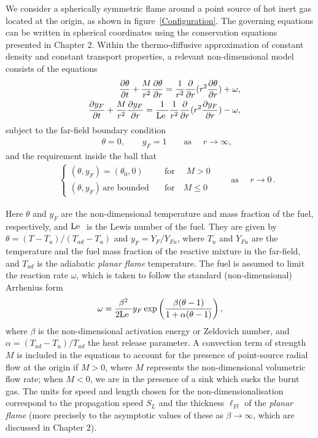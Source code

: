 We consider a spherically symmetric flame around a point source of
hot inert gas located at the origin, as shown in figure~\ref{Configuration}. The governing equations can be written in spherical coordinates using the conservation equations presented in Chapter 2. Within the thermo-diffusive
approximation of constant density and constant transport properties,
a relevant non-dimensional model consists of the equations
\begin{eqnarray}
&&\label{eqn:num:theta}\frac{\partial{\theta}}{{\partial t}}+
\frac{M}{r^2}\frac{\partial{\theta}}{{\partial r}}=\frac{1}
{r^{2}}\frac{\partial}{\partial r} (r^{2}\frac{
\partial{\theta}}{{\partial r}})+ \omega,
\\
&&\label{eqn:num:yF}\frac{\partial{y_{F}}}{{\partial t}}+
\frac{M}{r^2}\frac{\partial{y_{F}}}{{\partial
r}}=\frac{1}{\text{Le }}\frac{1} {r^{2}}\frac{\partial}{\partial r}
(r^{2}\frac{
\partial{y_{F}}}{{\partial r}})- \omega,
\end{eqnarray}
subject to the  far-field boundary condition
\begin{eqnarray}
&&\label{eqn:num:cond:R}\theta=0, \quad \quad y_{F}=1 \quad \quad
\text{as }\quad r\rightarrow \infty,
\end{eqnarray}
and the requirement inside the ball that
\begin{eqnarray}
&&\label{eqn:num:cond:Lg}
\begin{cases} (\theta,y_F)=(\theta_0,0) &\quad  \text{for } \quad M>0  \\
 (\theta,y_F)\, \text {are bounded}  &\quad  \text{for} \quad  M\leq 0
\end{cases}  \quad \quad \text{as } \quad r\rightarrow 0\,.
\end{eqnarray}

Here $\theta$ and $y_{F}$ are the non-dimensional  temperature and
mass fraction of the fuel, respectively, and $\text{Le }$ is the Lewis
number of the fuel.  They are given by $\theta = (T-T_u)/(T_{ad}-T_u)$ and $y_F
= Y_F/ Y_{Fu}$, where $T_u$ and $Y_{Fu}$ are the temperature and the
fuel mass fraction of the  reactive mixture in the far-field, and
$T_{ad}$ is the adiabatic \emph {planar flame} temperature. The fuel
is assumed to   limit the reaction rate $\omega$, which is taken to
follow the standard (non-dimensional) Arrhenius form
\[ \omega =
\frac{\beta^{2}}{2 \text{Le }} y_{F} \exp\left(\frac{\beta
(\theta-1)}{1+\alpha(\theta-1)}\right),
\]
where $\beta$ is the non-dimensional activation energy or Zeldovich
number, and $\alpha=(T_{ad}-T_{u})/T_{ad}$ the heat release parameter.
A convection term of strength $M$  is included in the equations to
account for the presence of  point-source radial flow  at the origin if $M>0$, where $M$ represents the
non-dimensional volumetric flow rate; when $M<0$, we are in the presence of a sink which sucks the burnt gas. The units for speed and length chosen for the non-dimensionalisation correspond to
the propagation speed $S_{L}$  and the thickness $\ell_{Fl}$ of the
\emph{planar flame} (more precisely to the asymptotic values of
these as $\beta \rightarrow \infty$, which are discussed in Chapter 2).

